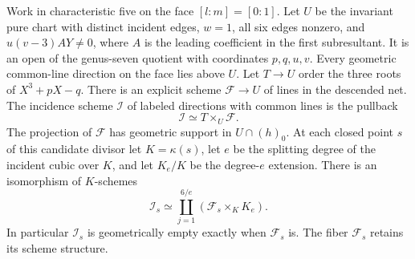 \begin{theorem}
\label{thm:common-line-decomposition}
Work in characteristic five on the face \([l:m]=[0:1]\).
Let \(U\) be the invariant pure chart with distinct incident edges,
\(w=1\), all six edges nonzero, and \(u(v-3)AY\ne0\), where \(A\)
is the leading coefficient in the first subresultant. It is an open
of the genus-seven quotient with coordinates \(p,q,u,v\). Every
geometric common-line direction on the face lies above \(U\).
Let \(T\to U\) order the three roots of \(X^3+pX-q\).
There is an explicit scheme \(\mathcal F\to U\) of lines in the
descended net. The incidence scheme \(\mathcal I\) of labeled
directions with common lines is the pullback
\[
                \mathcal I\simeq T\times_U\mathcal F .
\]
The projection of \(\mathcal F\) has geometric support in
\(U\cap(h)_0\). At each closed point \(s\) of this candidate divisor
let \(K=\kappa(s)\), let \(e\) be the splitting degree of the incident
cubic over \(K\), and let \(K_e/K\) be the degree-\(e\) extension.
There is an isomorphism of \(K\)-schemes
\[
     \mathcal I_s\simeq
        \coprod_{j=1}^{6/e} (\mathcal F_s\times_K K_e).
\]
In particular \(\mathcal I_s\) is geometrically empty exactly when
\(\mathcal F_s\) is. The fiber \(\mathcal F_s\) retains its scheme structure.
\end{theorem}

